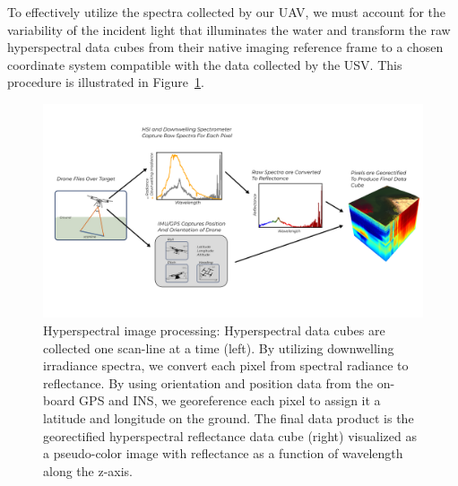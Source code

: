 \documentclass[remotesensing,article,accept,pdftex,moreauthors]{Definitions/mdpi}
\begin{document}
To effectively utilize the spectra collected by our UAV, we must account for the variability of the incident light that illuminates the water and transform the raw hyperspectral data cubes from their native imaging reference frame to a chosen coordinate system compatible with the data collected by the USV. This procedure is illustrated in Figure~\ref{fig:hsi-pipeline}.

\begin{figure}[H]
\vspace{-0.3in}
\hspace{-6pt}\includegraphics[width=14cm]{figures/materials-and-methods/pipeline-figure-2.pdf}
\vspace{-0.4in}
\caption{Hyperspectral image processing: Hyperspectral data cubes are collected one scan-line at a time (left). By utilizing downwelling irradiance spectra, we convert each pixel from spectral radiance to reflectance. By using orientation and position data from the on-board GPS and INS, we georeference each pixel to assign it a latitude and longitude on the ground. The final data product is the georectified hyperspectral reflectance data cube (right) visualized as a pseudo-color image with reflectance  as a function of wavelength along the z-axis.\label{fig:hsi-pipeline}}
\end{figure}  
\end{document}
